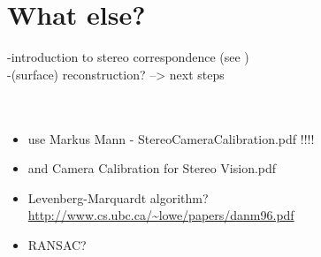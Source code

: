 \section{What else?}
-introduction to stereo correspondence (see \cite[p.468]{Szeliski.2011})\\
-(surface) reconstruction? --> next steps\\
\\
\\

\begin{itemize}
\item use Markus Mann - StereoCameraCalibration.pdf !!!!
\item and Camera Calibration for Stereo Vision.pdf
\item Levenberg-Marquardt algorithm? \url{http://www.cs.ubc.ca/~lowe/papers/danm96.pdf}
\item RANSAC?
\end{itemize}
